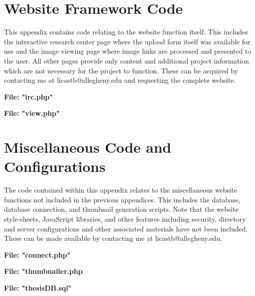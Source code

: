 \chapter{Website Framework Code}\label{appb:wejbcode}
This appendix contains code relating to the website function itself. This includes the interactive research center page where the upload form itself was available for use and the image viewing page where image links are processed and presented to the user. All other pages provide only content and additional project information which are not necessary for the project to function. These can be acquired by contacting me at licastb@allegheny.edu and requesting the complete website.

\textbf{File: "irc.php"}

\newpage
\textbf{File: "view.php"}

\newpage

\chapter{Miscellaneous Code and Configurations}\label{appc:misccode}
The code contained within this appendix relates to the miscellaneous website functions not included in the previous appendices. This includes the database, database connection, and thumbnail generation scripts. Note that the website style-sheets, JavaScript libraries, and other features including security, directory and server configurations and other associated materials have not been included. These can be made available by contacting me at licastb@allegheny.edu.

\textbf{File: "connect.php"}

\newpage
\textbf{File: "thumbnailer.php}

\newpage


\textbf{File: "thesisDB.sql"}

\newpage